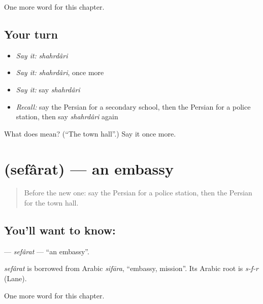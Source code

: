 \begin{grammarlens}[title={What you've built}]
One more word for this chapter.
\end{grammarlens}

\subsection*{Your turn}
\begin{itemize}
\raggedright
  \item \emph{Say it:} \emph{shahrdâri}
  \item \emph{Say it:} \emph{shahrdâri}, once more
  \item \emph{Say it:} say \emph{shahrdâri}
  \item \emph{Recall:} say the Persian for a secondary school, then the Persian for a police station, then say \emph{shahrdâri} again
\end{itemize}

\begin{tcolorbox}[breakable,colback=teal!4,colframe=teal!35!black,title={Before you move on}]
What does  mean? (\textquotedblleft{}The town hall\textquotedblright{}.) Say it once more.
\end{tcolorbox}
\section[\texorpdfstring{\fa{سفارت} (sefârat)}{سفارت (sefârat)}]{ (sefârat) — an embassy}

\label{lesson:FA-C155-sefarat}



\begin{quote}
Before the new one: say the Persian for a police station, then the Persian for the town hall.
\end{quote}

\subsection*{You'll want to know: }
\textbf{} — \emph{sefârat} — \textquotedblleft{}an embassy\textquotedblright{}.

\begin{cousinweb}
\emph{sefârat} is borrowed from Arabic \emph{sifāra}, \textquotedblleft{}embassy, mission\textquotedblright{}. Its Arabic root is \emph{s-f-r} (Lane).
\end{cousinweb}

\begin{grammarlens}[title={What you've built}]
One more word for this chapter.
\end{grammarlens}

